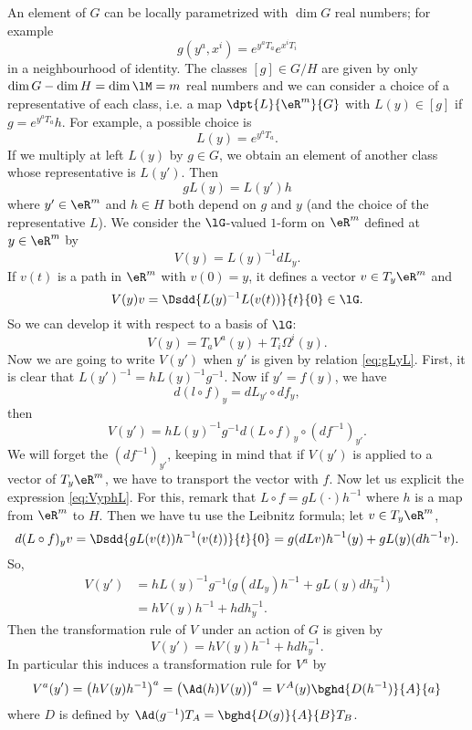 An element of $G$ can be locally parametrized with $\dim G$ real numbers; for example
\[
   g(y^a,x^i)=e^{y^aT_a}e^{x^iT_i}
\]
in a neighbourhood of identity. The classes $[g]\in G/H$ are given by only $\dim G-\dim H=\dim\lM=m$ real numbers and we can consider a choice of a representative of each class, i.e. a map $\dpt{L}{\eR^m}{G}$ with $L(y)\in[g]$ if $g=e^{y^aT_a}h$. For example, a possible choice is
\[
  L(y)=e^{y^aT_a}.
\]
If we multiply at left $L(y)$ by $g\in G$, we obtain an element of another class whose representative is $L(y')$. Then
\begin{equation}\label{eq:gLyL}
  gL(y)=L(y')h
\end{equation}
where $y'\in\eR^m$ and $h\in H$ both depend on $g$ and $y$ (and the choice of the representative $L$). We consider the $\lG$-valued $1$-form on $\eR^m$ defined at $y\in\eR^m$ by
\begin{equation}
    V(y)=L(y)^{-1} dL_y.
\end{equation}
If $v(t)$ is a path in $\eR^m$ with $v(0)=y$, it defines a vector $v\in T_y\eR^m$ and
\[
  V(y)v=\Dsdd{ L(y)^{-1} L(v(t)) }{t}{0}\in\lG.
\]
So we can develop it with respect to a basis of $\lG$:
\[
   V(y)=T_aV^a(y)+T_i\Omega^i(y).
\]
Now we are going to write $V(y')$ when $y'$ is given by relation \eqref{eq:gLyL}. First, it is clear that $L(y')^{-1}=hL(y)^{-1} g^{-1}$. Now if $y'=f(y)$, we have
\[
   d(l\circ f)_y=dL_{y'}\circ df_y,
\]
then
\begin{equation}\label{eq:VyphL}
V(y')=hL(y)^{-1} g^{-1} d(L\circ f)_y\circ(df^{-1})_{y'}.
\end{equation}
We will forget the $(df^{-1})_{y'}$, keeping in mind that if $V(y')$ is applied to a vector of $T_y\eR^m$, we have to transport the vector with $f$. Now let us explicit the expression \eqref{eq:VyphL}. For this, remark that $L\circ f=gL(\cdot)h^{-1}$ where $h$ is a map from $\eR^m$ to $H$. Then we have tu use the Leibnitz formula; let $v\in T_y\eR^m$,
\begin{equation}
  d(L\circ f)_yv=\Dsdd{ gL(v(t))h^{-1}(v(t)) }{t}{0}
                =g(dLv)h^{-1}(y)+gL(y)(dh^{-1} v).
\end{equation}
So,
\begin{equation}
\begin{split}
   V(y')&=hL(y)^{-1} g^{-1}\big(  g(dL_y) h^{-1}+gL(y)dh^{-1}_y   \big)\\
        &=h V(y)h^{-1}+hdh^{-1}_y.
\end{split}
\end{equation}
Then the transformation rule of $V$ under an action of $G$ is given by
\begin{equation}
    V(y')=hV(y)h^{-1}+hdh^{-1}_y.
\end{equation}
In particular this induces a transformation rule for $V^a$ by
\begin{equation}\label{eq:trans_V}
V^a(y')=\big(  hV(y)h^{-1}  \big)^a=\big(\Ad(h)V(y)\big)^a=V^A(y)\bghd{D(h^{-1})}{A}{a}
\end{equation}
where $D$ is defined by $\Ad(g^{-1})T_A=\bghd{D(g)}{A}{B}T_B$.

